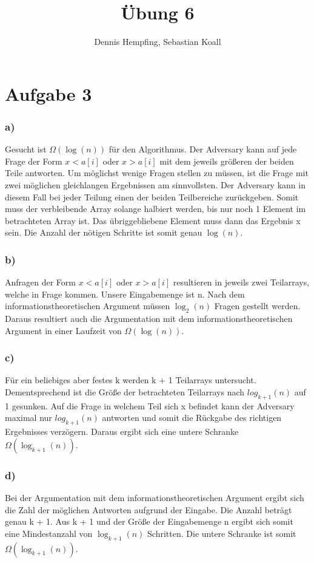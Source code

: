 \documentclass[12pt]{scrartcl}%
\theoremstyle{nonumberplain}
\newcommand{\bOg}[1]{\Omega (#1)}
\begin{document}
\author{Dennis Hempfing, Sebastian Koall}
\title{Übung 6}
\date{} 
\pagestyle{myheadings}

\maketitle %

\section*{Aufgabe 3}
\subsubsection*{a)}
Gesucht ist $\bOg{\log{(n)}}$ für den Algorithmus. Der Adversary kann auf jede Frage der Form $x < a[i]$ oder $x > a[i]$ mit dem jeweils größeren der beiden Teile antworten. Um möglichst wenige Fragen stellen zu müssen, ist die Frage mit zwei möglichen gleichlangen Ergebnissen am sinnvollsten. Der Adversary kann in diesem Fall bei jeder Teilung einen der beiden Teilbereiche zurückgeben. Somit muss der verbleibende Array solange halbiert werden, bis nur noch 1 Element im betrachteten Array ist. Das übriggebliebene Element muss dann das Ergebnis x sein. Die Anzahl der nötigen Schritte ist somit genau $ \log {(n)}$.

\subsubsection*{b)}
Anfragen der Form $x < a[i]$ oder $x > a[i]$ resultieren in jeweils zwei Teilarrays, welche in Frage kommen. Unsere Eingabemenge ist n. Nach dem informationstheoretischen Argument müssen $\log_2{(n)}$ Fragen gestellt werden. Daraus resultiert auch die Argumentation mit dem informationstheoretischen Argument in einer Laufzeit von $\bOg{\log{(n)}}$.

\subsubsection*{c)}
Für ein beliebiges aber festes k werden k + 1 Teilarrays untersucht. Dementsprechend ist die Größe der betrachteten Teilarrays nach $log_{k+1}{(n)}$ auf 1 gesunken. Auf die Frage in welchem Teil sich x befindet kann der Adversary maximal nur $log_{k+1}{(n)}$ antworten und somit die Rückgabe des richtigen Ergebnisses verzögern. Daraus ergibt sich eine untere Schranke $\bOg{\log_{k + 1}{(n)}}$.  

\subsubsection*{d)}
Bei der Argumentation mit dem informationstheoretischen Argument ergibt sich die Zahl der möglichen Antworten aufgrund der Eingabe. Die Anzahl beträgt genau k + 1. Aus k  + 1 und der Größe der Eingabemenge n ergibt sich somit eine Mindestanzahl von $\log_{k + 1}{(n)}$ Schritten. Die untere Schranke ist somit $\bOg{\log_{k + 1}{(n)}}$.
\end{document}
